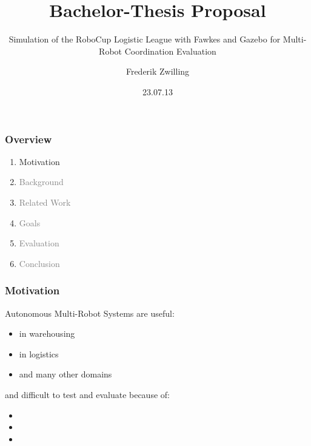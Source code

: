 \documentclass{beamer}
\title{Bachelor-Thesis Proposal}
\subtitle{Simulation of the RoboCup Logistic League with Fawkes and Gazebo for Multi-Robot Coordination Evaluation}
\author {Frederik Zwilling}
\institute{RWTH Aachen}
\date{23.07.13}
\begin{document}
\frame{\titlepage}

\begin{frame}
\frametitle{Overview}
\begin{enumerate}
\item Motivation
\item \textcolor{gray}{Background}
\item \textcolor{gray}{Related Work}
\item \textcolor{gray}{Goals}
\item \textcolor{gray}{Evaluation}
\item \textcolor{gray}{Conclusion}
\end{enumerate}
\end{frame}

\begin{frame}
\frametitle{Motivation}
\begin{multicols}{2}
Autonomous Multi-Robot Systems are useful:
\begin{itemize}
\item<1-> in warehousing
\item<2-> in logistics
\item<3-> and many other domains
\end{itemize}
\begin{figure}
\end{figure}
\end{multicols}
\pause
\begin{multicols}{2}
and difficult to test and evaluate because of:
\begin{itemize}
\item<4->
\item<5->
\item<6->
\end{itemize}
\end{multicols}
\end{frame}
\end{document}
